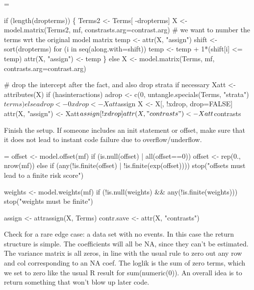 \documentclass{article}
\begin{document}
\begin{nwchunk}
=
 
 if (length(dropterms)) \{
     Terms2 <- Terms[ -dropterms]
     X <- model.matrix(Terms2, mf, constrasts.arg=contrast.arg)
     # we want to number the terms wrt the original model matrix
     temp <- attr(X, "assign")
     shift <- sort(dropterms)
     for (i in seq(along.with=shift))
         temp <- temp + 1*(shift[i] <= temp)
     attr(X, "assign") <- temp 
 \}
 else X <- model.matrix(Terms, mf, contrasts.arg=contrast.arg)
 
 # drop the intercept after the fact, and also drop strata if necessary
 Xatt <- attributes(X) 
 if (hasinteractions) adrop <- c(0, untangle.specials(Terms, "strata")$terms)
 else adrop <- 0
 xdrop <- Xatt$assign %
 X <- X[, !xdrop, drop=FALSE]
 attr(X, "assign") <- Xatt$assign[!xdrop]
 attr(X, "contrasts") <- Xatt$contrasts
\end{nwchunk}

Finish the setup.  If someone includes an init statement or offset, make sure
that it does not lead to instant code failure due to overflow/underflow.
\begin{nwchunk}
=
 offset <- model.offset(mf)
 if (is.null(offset) | all(offset==0)) offset <- rep(0., nrow(mf))
 else if (any(!is.finite(offset) | !is.finite(exp(offset)))) 
     stop("offsets must lead to a finite risk score")
     
 weights <- model.weights(mf)
 if (!is.null(weights) && any(!is.finite(weights)))
     stop("weights must be finite")   
 
 assign <- attrassign(X, Terms)
 contr.save <- attr(X, "contrasts")
\end{nwchunk}

Check for a rare edge case: a data set with no events.  In this case the
return structure is simple.
The coefficients will all be NA, since they can't be estimated.
The variance matrix is all zeros, in line with the usual rule to zero out
any row and col corresponding to an NA coef.
The loglik is the sum of zero terms, which we set to zero like the usual
R result for sum(numeric(0)).  
An overall idea is to return something that won't blow up later code.
\end{document}
